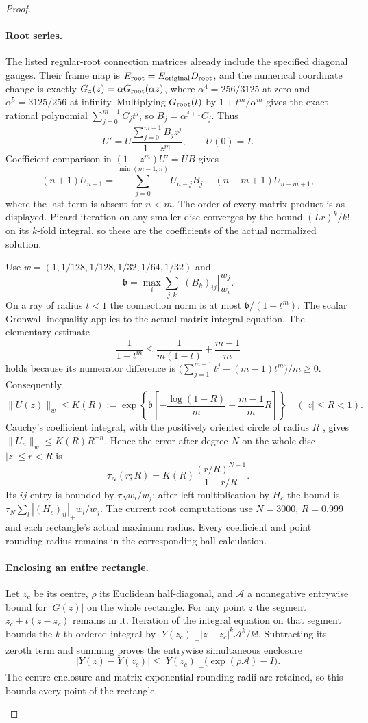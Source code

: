 \begin{proof}
\begin{enumerate}[label=\arabic*.]
\paragraph{Root series.}
The listed regular-root connection matrices already include the
specified diagonal gauges. Their frame map is
$E_{\rm root}=E_{\rm original}D_{\rm root}$, and the numerical
coordinate change is exactly
$G_z(z)=\alpha G_{\rm root}(\alpha z)$, where
$\alpha^4=256/3125$ at zero and $\alpha^5=3125/256$ at infinity.
Multiplying $G_{\rm root}(t)$ by $1+t^m/\alpha^m$ gives the exact
rational polynomial $\sum_{j=0}^{m-1}C_jt^j$, so
$B_j=\alpha^{j+1}C_j$. Thus
\[
 U'=U\frac{\sum_{j=0}^{m-1}B_jz^j}{1+z^m},\qquad U(0)=I.\tag{1.18.2}
\]
Coefficient comparison in $(1+z^m)U'=UB$ gives
\[
 (n+1)U_{n+1}
 =\sum_{j=0}^{\min(m-1,n)}U_{n-j}B_j
   -(n-m+1)U_{n-m+1},
\]
where the last term is absent for $n<m$. The order of every
matrix product is as displayed. Picard iteration on any smaller
disc converges by the bound $(Lr)^k/k!$ on its $k$-fold integral,
so these are the coefficients of the actual normalized solution.

Use $w=(1,1/128,1/128,1/32,1/64,1/32)$ and
\[
 \mathfrak b=\max_i\sum_{j,k}|(B_k)_{ij}|\frac{w_j}{w_i}.
\]
On a ray of radius $t<1$ the connection norm is at most
$\mathfrak b/(1-t^m)$. The scalar Gronwall inequality
\cite[Lemma~2.7, pp.~42--43]{TeschlODE2012} applies to the actual
matrix integral equation. The elementary estimate
\[
 \frac1{1-t^m}\le\frac1{m(1-t)}+\frac{m-1}{m}
\]
holds because its numerator difference is
$\bigl(\sum_{j=1}^{m-1}t^j-(m-1)t^m\bigr)/m\ge0$.
Consequently
\[
 \|U(z)\|_w\le K(R):=
 \exp\!\left\{\mathfrak b\left[-\frac{\log(1-R)}m
                 +\frac{m-1}{m}R\right]\right\}
 \quad (|z|\le R<1).
\]
Cauchy's coefficient integral, with the positively oriented circle
of radius $R$ \cite[\S1.9(iii), (1.9.30)--(1.9.31)]{DLMFCauchy2026},
gives $\|U_n\|_w\le K(R)R^{-n}$. Hence the error after degree $N$
on the whole disc $|z|\le r<R$ is
\[
 \tau_N(r;R)=K(R)\frac{(r/R)^{N+1}}{1-r/R}.\tag{1.18.3}
\]
Its $ij$ entry is bounded by $\tau_Nw_i/w_j$; after left
multiplication by $H_c$ the bound is
$\tau_N\sum_l|(H_c)_{il}|_+w_l/w_j$.
The current root computations use $N=3000$, $R=0.999$ and each
rectangle's actual maximum radius. Every coefficient and point
rounding radius remains in the corresponding ball calculation.

\paragraph{Enclosing an entire rectangle.}
Let $z_c$ be its centre, $\rho$ its Euclidean half-diagonal, and
$\mathcal A$ a nonnegative entrywise bound for $|G(z)|$ on the
whole rectangle. For any point $z$ the segment
$z_c+t(z-z_c)$ remains in it. Iteration of the integral equation
on that segment bounds the $k$-th ordered integral by
$|Y(z_c)|_+|z-z_c|^k\mathcal A^k/k!$. Subtracting its zeroth term
and summing proves the entrywise simultaneous enclosure
\[
 |Y(z)-Y(z_c)|
 \le |Y(z_c)|_+\bigl(\exp(\rho\mathcal A)-I\bigr).
\]
The centre enclosure and matrix-exponential rounding radii are
retained, so this bounds every point of the rectangle.


\end{enumerate}
\end{proof}
